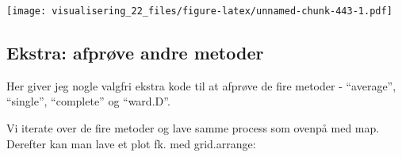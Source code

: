 \documentclass[
]{book}
\newenvironment{Shaded}{\begin{snugshade}}{\end{snugshade}}
\newcommand{\AttributeTok}[1]{\textcolor[rgb]{0.77,0.63,0.00}{#1}}
\newcommand{\CommentTok}[1]{\textcolor[rgb]{0.56,0.35,0.01}{\textit{#1}}}
\newcommand{\DecValTok}[1]{\textcolor[rgb]{0.00,0.00,0.81}{#1}}
\newcommand{\ErrorTok}[1]{\textcolor[rgb]{0.64,0.00,0.00}{\textbf{#1}}}
\newcommand{\FunctionTok}[1]{\textcolor[rgb]{0.00,0.00,0.00}{#1}}
\newcommand{\NormalTok}[1]{#1}
\newcommand{\OtherTok}[1]{\textcolor[rgb]{0.56,0.35,0.01}{#1}}
\newcommand{\SpecialCharTok}[1]{\textcolor[rgb]{0.00,0.00,0.00}{#1}}
\begin{document}
\texttt{[image: visualisering\_22\_files/figure-latex/unnamed-chunk-443-1.pdf]}

\hypertarget{ekstra-afpruxf8ve-andre-metoder}{%
\subsection{Ekstra: afprøve andre metoder}\label{ekstra-afpruxf8ve-andre-metoder}}

Her giver jeg nogle valgfri ekstra kode til at afprøve de fire metoder - ``average'', ``single'', ``complete'' og ``ward.D''.

\begin{Shaded}
\end{Shaded}

Vi iterate over de fire metoder og lave samme process som ovenpå med map. Derefter kan man lave et plot fk. med grid.arrange:
\end{document}
